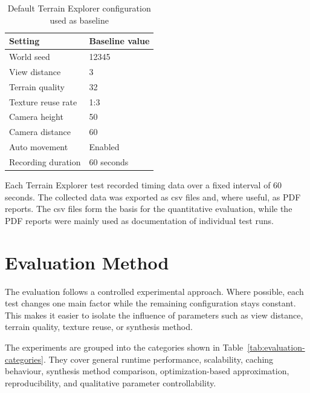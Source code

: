 \begin{table}[H]
\centering
\caption{Default Terrain Explorer configuration used as baseline}
\label{tab:evaluation-baseline-config}
\begin{tabularx}{\textwidth}{|l|X|}
\hline
\textbf{Setting} & \textbf{Baseline value} \\
\hline
\hline
World seed & 12345 \\
\hline
View distance & 3 \\
\hline
Terrain quality & 32 \\
\hline
Texture reuse rate & 1:3 \\
\hline
Camera height & 50 \\
\hline
Camera distance & 60 \\
\hline
Auto movement & Enabled \\
\hline
Recording duration & 60 seconds \\
\hline
\end{tabularx}
\end{table}

Each Terrain Explorer test recorded timing data over a fixed interval of 60 seconds. The collected data was exported as \gls{csv} files and, where useful, as PDF reports. The \gls{csv} files form the basis for the quantitative evaluation, while the PDF reports were mainly used as documentation of individual test runs.

\section{Evaluation Method}

The evaluation follows a controlled experimental approach. Where possible, each test changes one main factor while the remaining configuration stays constant. This makes it easier to isolate the influence of parameters such as view distance, terrain quality, texture reuse, or synthesis method.

The experiments are grouped into the categories shown in Table~\ref{tab:evaluation-categories}. They cover general runtime performance, scalability, caching behaviour, synthesis method comparison, optimization-based approximation, reproducibility, and qualitative parameter controllability.

